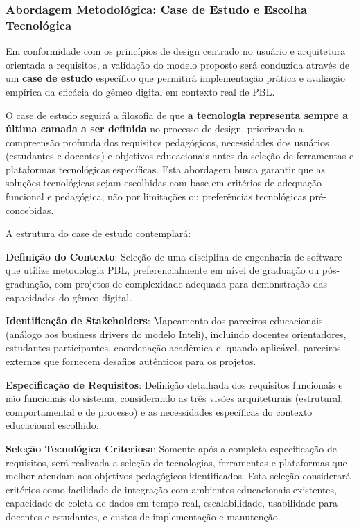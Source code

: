 \documentclass[12pt,a4paper]{article}
\begin{document}
\subsubsection{Abordagem Metodológica: Case de Estudo e Escolha Tecnológica}

Em conformidade com os princípios de design centrado no usuário e arquitetura
orientada a requisitos, a validação do modelo proposto será conduzida através
de um \textbf{case de estudo} específico que permitirá implementação prática e
avaliação empírica da eficácia do gêmeo digital em
contexto real de PBL.

O case de estudo seguirá a filosofia de que \textbf{a tecnologia representa
  sempre a última camada a ser definida} no processo de design, priorizando a
compreensão profunda dos requisitos pedagógicos, necessidades dos usuários
(estudantes e docentes) e objetivos educacionais antes da seleção de
ferramentas e plataformas tecnológicas específicas. Esta abordagem busca
garantir que as soluções tecnológicas sejam escolhidas com base em critérios de
adequação funcional e pedagógica, não por limitações ou preferências
tecnológicas pré-concebidas.

A estrutura do case de estudo contemplará:

\textbf{Definição do Contexto}: Seleção de uma disciplina de engenharia de software que utilize metodologia PBL, preferencialmente em nível de graduação ou pós-graduação, com projetos de complexidade adequada para demonstração das capacidades do gêmeo digital.

\textbf{Identificação de Stakeholders}: Mapeamento dos parceiros educacionais (análogo aos business drivers do modelo Inteli), incluindo docentes orientadores, estudantes participantes, coordenação acadêmica e, quando aplicável, parceiros externos que fornecem desafios autênticos para os projetos.

\textbf{Especificação de Requisitos}: Definição detalhada dos requisitos funcionais e não funcionais do sistema, considerando as três visões arquiteturais (estrutural, comportamental e de processo) e as necessidades específicas do contexto educacional escolhido.

\textbf{Seleção Tecnológica Criteriosa}: Somente após a completa especificação de requisitos, será realizada a seleção de tecnologias, ferramentas e plataformas que melhor atendam aos objetivos pedagógicos identificados. Esta seleção considerará critérios como facilidade de integração com ambientes educacionais existentes, capacidade de coleta de dados em tempo real, escalabilidade, usabilidade para docentes e estudantes, e custos de implementação e manutenção.
\end{document}
